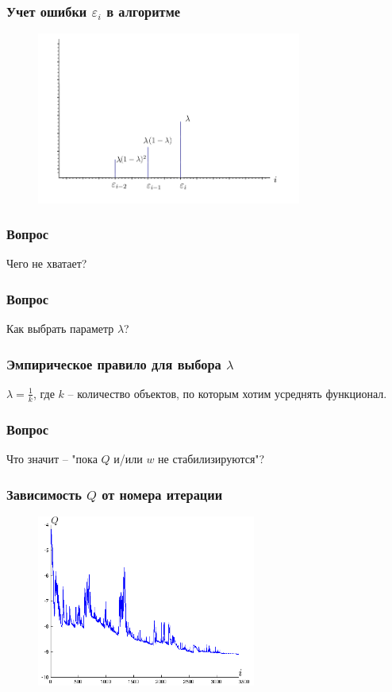 \documentclass[12pt]{beamer}
\begin{document}
\begin{frame}\frametitle{Учет ошибки $\varepsilon_i$ в алгоритме}
\begin{figure}[htbp]
  \includegraphics[height=160pt, keepaspectratio = true]{images/l2}   
\end{figure}
\end{frame}

\begin{frame}\frametitle{Вопрос}
Чего не хватает?
\end{frame}

\begin{frame}\frametitle{Вопрос}
Как выбрать параметр $\lambda$?
\end{frame}

\begin{frame}\frametitle{Эмпирическое правило для выбора $\lambda$}
$\lambda = \frac{1}{k}$, где $k$ -- количество объектов, по которым хотим усреднять функционал.
\end{frame}

\begin{frame}\frametitle{Вопрос}
Что значит -- "пока $Q$ и/или $w$ не стабилизируются"?
\end{frame}

\begin{frame}\frametitle{Зависимость $Q$ от номера итерации}
\begin{figure}[htbp]
  \includegraphics[height=160pt, keepaspectratio = true]{images/stochastic_gradient}   
\end{figure}
\end{frame}
\end{document}
